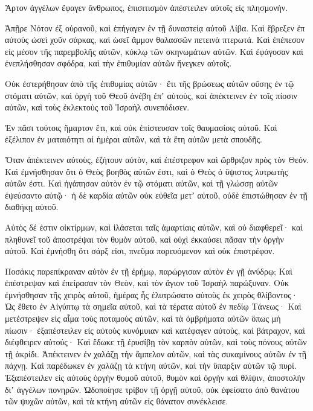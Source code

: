 {Ἄρτον ἀγγέλων ἔφαγεν ἄνθρωπος, ἐπισιτισμὸν ἀπέστειλεν αὐτοῖς εἰς πλησμονήν.
\par }{\PP {}Ἀπῇρε Νότον ἐξ οὐρανοῦ, καὶ ἐπήγαγεν ἐν τῇ δυναστείᾳ αὐτοῦ Λίβα.
Καὶ ἔβρεξεν ἐπ αὐτοὺς ὡσεὶ χοῦν σάρκας, καὶ ὡσεῖ ἄμμον θαλασσῶν πετεινὰ πτερωτά.
Καὶ ἐπέπεσον εἰς μέσον τῆς παρεμβολῆς αὐτῶν, κύκλῳ τῶν σκηνωμάτων αὐτῶν.
Καὶ ἐφάγοσαν καὶ ἐνεπλήσθησαν σφόδρα, καὶ τὴν ἐπιθυμίαν αὐτῶν ἤνεγκεν αὐτοῖς.
\par }{\PP {}Οὐκ ἐστερήθησαν ἀπὸ τῆς ἐπιθυμίας αὐτῶν· ἔτι τῆς βρώσεως αὐτῶν οὔσης ἐν τῷ στόματι αὐτῶν,
καὶ ὀργὴ τοῦ Θεοῦ ἀνέβη ἐπʼ αὐτοὺς, καὶ ἀπέκτεινεν ἐν τοῖς πίοσιν αὐτῶν, καὶ τοὺς ἐκλεκτοὺς τοῦ Ἰσραὴλ συνεπόδισεν.
\par }{\PP {}Ἐν πᾶσι τούτοις ἥμαρτον ἔτι, καὶ οὐκ ἐπίστευσαν τοῖς θαυμασίοις αὐτοῦ.
Καὶ ἐξέλιπον ἐν ματαιότητι αἱ ἡμέραι αὐτῶν, καὶ τὰ ἔτη αὐτῶν μετὰ σπουδῆς.
\par }{\PP {}Ὅταν ἀπέκτεινεν αὐτοὺς, ἐζήτουν αὐτὸν, καὶ ἐπέστρεφον καὶ ὤρθριζον πρὸς τὸν Θεόν.
Καὶ ἐμνήσθησαν ὅτι ὁ Θεὸς βοηθὸς αὐτῶν ἐστι, καὶ ὁ Θεὸς ὁ ὕψιστος λυτρωτὴς αὐτῶν ἐστι.
Καὶ ἠγάπησαν αὐτὸν ἐν τῷ στόματι αὐτῶν, καὶ τῇ γλώσσῃ αὐτῶν ἐψεύσαντο αὐτῷ·
ἡ δὲ καρδία αὐτῶν οὐκ εὐθεῖα μετʼ αὐτοῦ, οὐδὲ ἐπιστώθησαν ἐν τῇ διαθήκῃ αὐτοῦ.
\par }{\PP {}Αὐτὸς δέ ἐστιν οἰκτίρμων, καὶ ἱλάσεται ταῖς ἁμαρτίαις αὐτῶν, καὶ οὐ διαφθερεῖ· καὶ πληθυνεῖ τοῦ ἀποστρέψαι τὸν θυμὸν αὐτοῦ, καὶ οὐχὶ ἐκκαύσει πᾶσαν τὴν ὀργὴν αὐτοῦ.
Καὶ ἐμνήσθη ὅτι σάρξ εἰσι, πνεῦμα πορευόμενον καὶ οὐκ ἐπιστρέφον.
\par }{\PP {}Ποσάκις παρεπίκραναν αὐτὸν ἐν τῇ ἐρήμῳ, παρώργισαν αὐτὸν ἐν γῇ ἀνύδρῳ;
Καὶ ἐπέστρεψαν καὶ ἐπείρασαν τὸν Θεὸν, καὶ τὸν ἅγιον τοῦ Ἰσραὴλ παρώξυναν.
Οὐκ ἐμνήσθησαν τῆς χειρὸς αὐτοῦ, ἡμέρας ἧς ἐλυτρώσατο αὐτοὺς ἐκ χειρὸς θλίβοντος·
Ὡς ἔθετο ἐν Αἰγύπτῳ τὰ σημεῖα αὐτοῦ, καὶ τὰ τέρατα αὐτοῦ ἐν πεδίῳ Τάνεως·
Καὶ μετέστρεψεν εἰς αἷμα τοὺς ποταμοὺς αὐτῶν, καὶ τὰ ὀμβρήματα αὐτῶν ὅπως μὴ πίωσιν·
ἐξαπέστειλεν εἰς αὐτοὺς κυνόμυιαν καὶ κατέφαγεν αὐτοὺς, καὶ βάτραχον, καὶ διέφθειρεν αὐτούς·
Καὶ ἔδωκε τῇ ἐρυσίβῃ τὸν καρπὸν αὐτῶν, καὶ τοὺς πόνους αὐτῶν τῇ ἀκρίδι.
Ἀπέκτεινεν ἐν χαλάζῃ τὴν ἄμπελον αὐτῶν, καὶ τὰς συκαμίνους αὐτῶν ἐν
τῇ πάχνῃ. Καὶ παρέδωκεν ἐν χαλάζῃ τὰ κτήνη αὐτῶν, καὶ τὴν ὕπαρξιν αὐτῶν τῷ πυρί.
Ἐξαπέστειλεν εἰς αὐτοὺς ὀργὴν θυμοῦ αὐτοῦ, θυμὸν καὶ ὀργὴν καὶ θλίψιν, ἀποστολὴν διʼ ἀγγέλων πονηρῶν.
Ὡδοποίησε τρίβον τῇ ὀργῇ αὐτοῦ, οὐκ ἐφείσατο ἀπὸ θανάτου τῶν ψυχῶν αὐτῶν, καὶ τὰ κτήνη αὐτῶν εἰς θάνατον συνέκλεισε.
}
